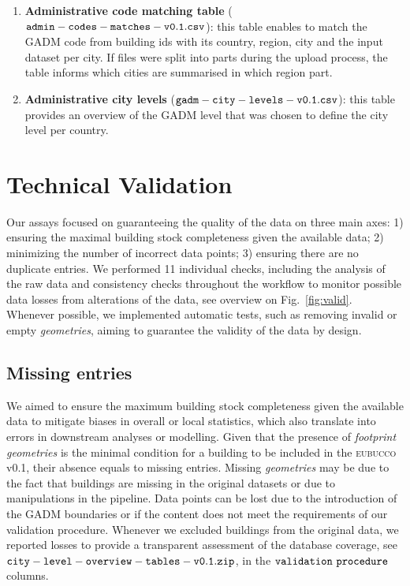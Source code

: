 \documentclass[fleqn,10pt]{wlscirep}
\begin{document}
\begin{enumerate}[topsep=1pt]
    \item \textbf{Administrative code matching table} (${\tt admin-codes-matches-v0.1.csv}$): this table enables to match the GADM code from building ids with its country, region, city and the input dataset per city. If files were split into parts during the upload process, the table informs which cities are summarised in which region part.
    
    \item \textbf{Administrative city levels} (${\tt gadm-city-levels-v0.1.csv}$): this table provides an overview of the GADM level that was chosen to define the city level per country.
    
\end{enumerate}


\section*{Technical Validation}
Our assays focused on guaranteeing the quality of the data on three main axes: 1) ensuring the maximal building stock completeness given the available data; 2) minimizing the number of incorrect data points; 3) ensuring there are no duplicate entries. We performed 11 individual checks, including the analysis of the raw data and consistency checks throughout the workflow to monitor possible data losses from alterations of the data, see overview on Fig.~\ref{fig:valid}. Whenever possible, we implemented automatic tests, such as removing invalid or empty \textit{geometries}, aiming to guarantee the validity of the data by design.   



\subsection*{Missing entries}

We aimed to ensure the maximum building stock completeness given the available data to mitigate biases in overall or local statistics, which also translate into errors in downstream analyses or modelling. 
Given that the presence of \textit{footprint geometries} is the minimal condition for a building to be included in the \textsc{eubucco} v0.1, their absence equals to missing entries. 
Missing \textit{geometries} may be due to the fact that buildings are missing in the original datasets or due to manipulations in the pipeline. Data points can be lost due to the introduction of the GADM boundaries or if the content does not meet the requirements of our validation procedure. Whenever we excluded buildings from the original data, we reported losses to provide a transparent assessment of the database coverage, see ${\tt city-level-overview-tables-v0.1.zip}$, in the ${\tt validation\ procedure}$ columns.
\end{document}
